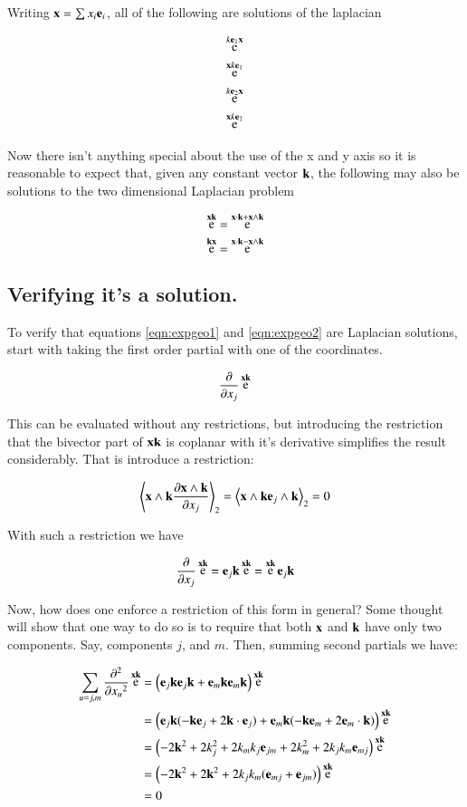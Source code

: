 \documentclass{article}      %
\newcommand{\dxj}[2] {\frac {\partial {#1}} {\partial {x_{#2}}}}
\newcommand{\dsqxj}[2] {\frac {\partial^2 {#1}} {\partial {x_{#2}}^2}}
\DeclareMathOperator{\Exp}{e}
\newcommand{\gpgrade}[2] {{\left\langle{{#1}}\right\rangle}_{#2}}
\newcommand{\gpgradetwo}[1] {\gpgrade{#1}{2}}
\begin{document}
Writing $\mathbf{x} = \sum x_i \mathbf{e}_i$, all of the following are solutions
of the laplacian

\begin{align*}
\Exp^{k\Be_1\Bx} \\
\Exp^{\Bx k\Be_1} \\
\Exp^{k\Be_2\Bx} \\
\Exp^{\Bx k\Be_2} \\
\end{align*}

Now there isn't anything special about the use of the x and y axis so it is reasonable to expect that, given any constant vector $\mathbf{k}$,
the following may also be solutions to the two dimensional Laplacian problem

\begin{equation}\label{eqn:expgeo1}
\Exp^{\Bx\Bk} = \Exp^{\Bx \cdot \Bk + \Bx \wedge \Bk}
\end{equation}
\begin{equation}\label{eqn:expgeo2}
\Exp^{\Bk\Bx} = \Exp^{\Bx \cdot \Bk - \Bx \wedge \Bk}
\end{equation}

\subsection{ Verifying it's a solution. }

To verify that equations \ref{eqn:expgeo1} and \ref{eqn:expgeo2} are Laplacian solutions, start with taking the first order partial with one of the coordinates.

\[
\dxj{}{j}\Exp^{\Bx\Bk}
\]

This can be evaluated without any restrictions, but introducing the restriction that the bivector part of $\mathbf{x}\mathbf{k}$
is coplanar with it's derivative simplifies the result considerably.  That is introduce a restriction:

\[
\gpgradetwo{ \Bx \wedge \Bk \dxj{\Bx \wedge \Bk}{j} } = \gpgradetwo{ \Bx \wedge \Bk \Be_j \wedge \Bk } = 0
\]

With such a restriction we have

\[
\dxj{}{j}\Exp^{\Bx\Bk} = \Be_j\Bk \Exp^{\Bx\Bk} = \Exp^{\Bx\Bk} \Be_j\Bk 
\]

Now, how does one enforce a restriction of this form in general?  Some thought will show that one way to do so 
is to require that
both $\mathbf{x}$ and $\mathbf{k}$ have only two components.  Say, components $j$, and $m$.  Then, summing second partials
we have:

\begin{align*}
\sum_{u=j,m}\dsqxj{}{u}\Exp^{\Bx\Bk}
&= \left( \Be_j\Bk \Be_j\Bk + \Be_m\Bk \Be_m\Bk \right) \Exp^{\Bx\Bk} \\
&= \left( \Be_j\Bk (-\Bk\Be_j + 2 \Bk \cdot \Be_j) + \Be_m\Bk (-\Bk\Be_m + 2 \Be_m \cdot \Bk) \right) \Exp^{\Bx\Bk} \\
&= \left( -2\Bk^2 + 2 k_j^2 + 2 k_m k_j \Be_{jm} + 2 k_m^2 + 2 k_j k_m \Be_{mj} \right) \Exp^{\Bx\Bk} \\
&= \left( -2\Bk^2 + 2 \Bk^2 + 2 k_j k_m (\Be_{mj} + \Be_{jm}) \right) \Exp^{\Bx\Bk} \\
&= 0 \\
\end{align*}
\end{document}
